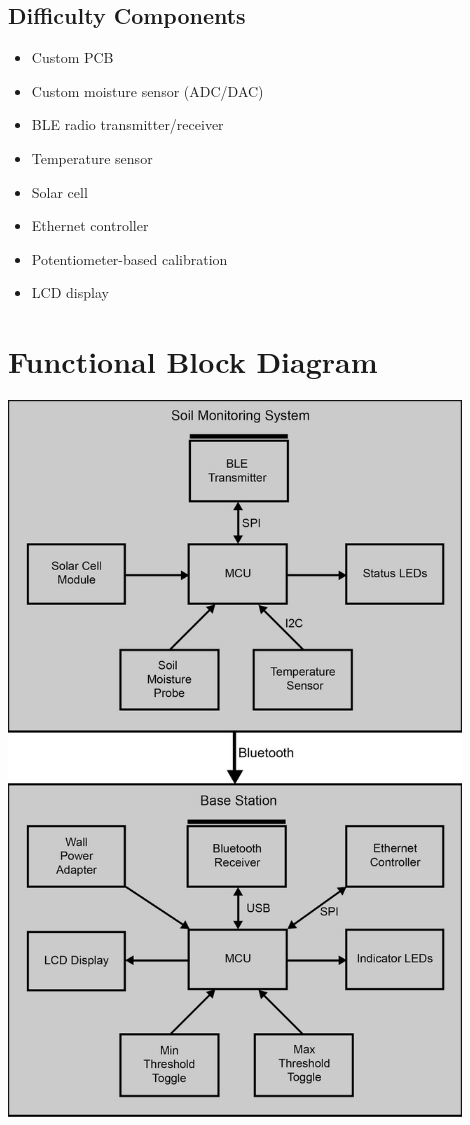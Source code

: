 \documentclass{article}
\begin{document}
\subsection{Difficulty Components}
\begin{itemize}
    \item Custom PCB
    \item Custom moisture sensor (ADC/DAC)
    \item BLE radio transmitter/receiver
    \item Temperature sensor
    \item Solar cell
	\item Ethernet controller
	\item Potentiometer-based calibration
	\item LCD display
\end{itemize}

\section{Functional Block Diagram}
\includegraphics[width=0.9\textwidth]{functional_diagram.png}
\end{document}
